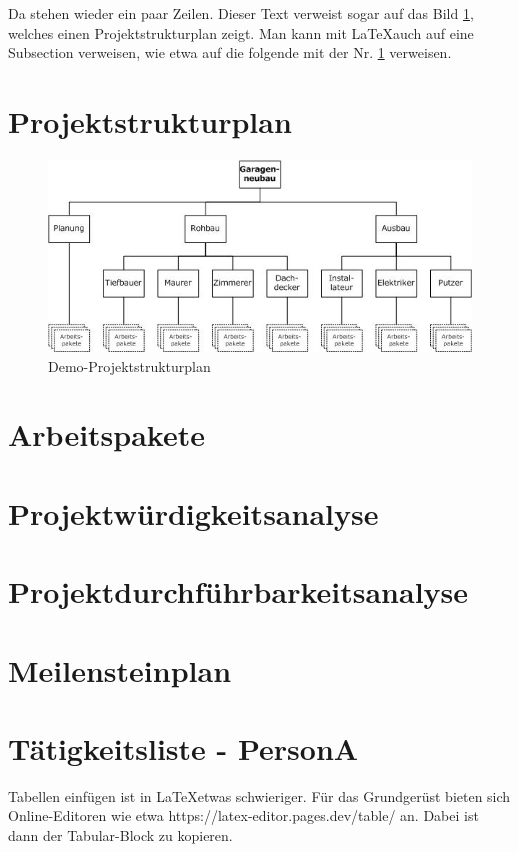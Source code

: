 Da stehen wieder ein paar Zeilen. Dieser Text verweist sogar auf das Bild \ref{fig:BildPSP}, welches einen Projektstrukturplan zeigt. Man kann mit \LaTeX auch auf eine Subsection verweisen, wie etwa auf die folgende mit der Nr. \ref{subsec:PSP} verweisen.

\section{Projektstrukturplan}
\label{subsec:PSP}

\begin{figure}
	\centering
	\includegraphics{Bilder/PSP.jpg}
	\caption{Demo-Projektstrukturplan}
	\label{fig:BildPSP}
\end{figure}

\section{Arbeitspakete}
\section{Projektwürdigkeitsanalyse}
\section{Projektdurchführbarkeitsanalyse}
\section{Meilensteinplan}
\section{Tätigkeitsliste - PersonA}

Tabellen einfügen ist in \LaTeX etwas schwieriger. Für das Grundgerüst bieten sich Online-Editoren wie etwa https://latex-editor.pages.dev/table/ an. Dabei ist dann der Tabular-Block zu kopieren.


